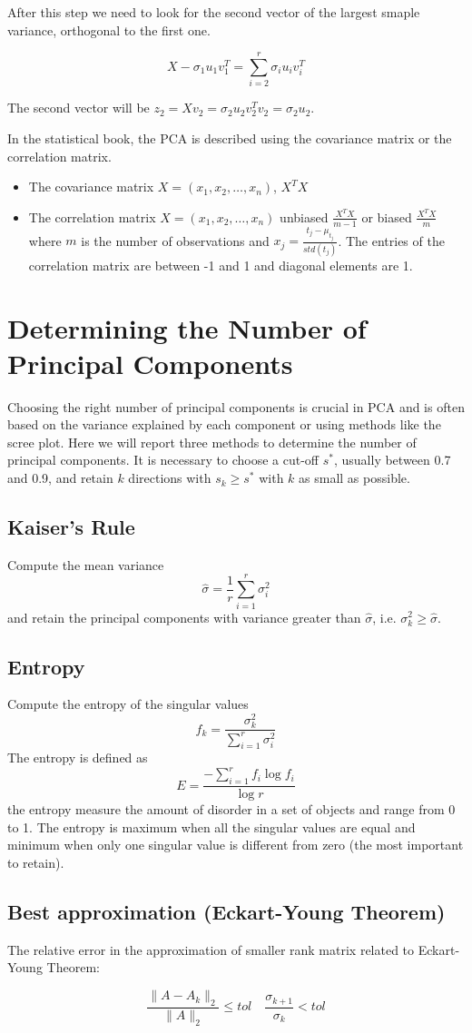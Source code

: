 After this step we need to look for the second vector of the largest smaple variance, orthogonal to the first one.

$$
X - \sigma_1 u_1 v_1^T = \sum_{i=2}^{r} \sigma_i u_i v_i^T
$$

The second vector will be $z_2 = Xv_2 = \sigma_2 u_2 v_2^T v_2 = \sigma_2 u_2$.

In the statistical book, the PCA is described using the covariance matrix or the correlation matrix.
\begin{itemize}
    \item The covariance matrix $X = (x_1, x_2, \ldots, x_n)$, $X^TX$
    \item The correlation matrix $X = (x_1, x_2, \ldots, x_n)$ unbiased $\frac{X^TX}{m-1}$ or biased $\frac{X^TX}{m}$
        where $m$ is the number of observations and $x_j = \frac{t_j - \mu_{t_j}}{std(t_j)}$.
        The entries of the correlation matrix are between -1 and 1 and diagonal elements are 1.
\end{itemize}

\section{Determining the Number of Principal Components}

Choosing the right number of principal components is crucial in PCA and is often based
on the variance explained by each component or using methods like the scree plot.
Here we will report three methods to determine the number of principal components.
It is necessary to choose a cut-off $s^*$, usually between 0.7 and 0.9, and retain $k$ directions
with $s_k \geq s^*$ with $k$ as small as possible.

\subsection{Kaiser's Rule}
Compute the mean variance
$$
\hat{\sigma} = \frac{1}{r} \sum_{i=1}^{r} \sigma_i^2
$$
and retain the principal components with variance greater than $\hat{\sigma}$, i.e. $\sigma_k^2 \geq \hat{\sigma}$.

\subsection{Entropy}
Compute the entropy of the singular values
$$f_k = \frac{\sigma_k^2}{\sum_{i=1}^{r} \sigma_i^2}$$
The entropy is defined as
$$ E = \frac{-\sum_{i=1}^{r} f_i \log f_i}{\log r} $$
the entropy measure the amount of disorder in a set of objects and range from 0 to 1.
The entropy is maximum when all the singular values are equal and minimum when only one singular value is different from zero (the most important to retain).

\subsection{Best approximation (Eckart-Young Theorem)}
The relative error in the approximation of smaller rank matrix related to Eckart-Young Theorem:

$$ \frac{\|A - A_k\|_2}{\|A\|_2} \leq tol \quad \frac{\sigma_{k + 1}}{\sigma_k} < tol $$